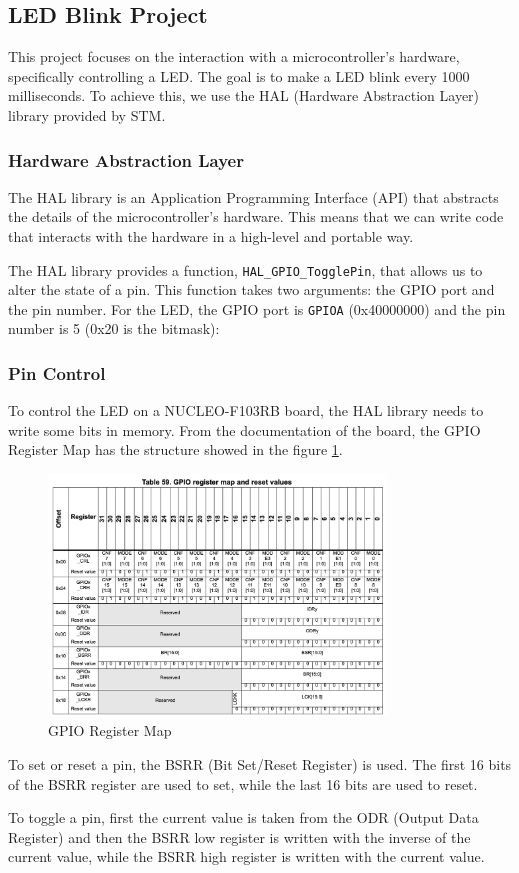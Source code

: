 \subsection{LED Blink Project}

This project focuses on the interaction with a microcontroller's hardware, specifically controlling a LED. The goal is to make a LED blink every 1000 milliseconds. To achieve this, we use the HAL (Hardware Abstraction Layer) library provided by STM.

\subsubsection{Hardware Abstraction Layer}

The HAL library is an Application Programming Interface (API) that abstracts the details of the microcontroller's hardware. This means that we can write code that interacts with the hardware in a high-level and portable way.

The HAL library provides a function, \texttt{HAL\_GPIO\_TogglePin}, that allows us to alter the state of a pin. This function takes two arguments: the GPIO port and the pin number. For the LED, the GPIO port is \texttt{GPIOA} (0x40000000) and the pin number is 5 (0x20 is the bitmask):

\subsubsection{Pin Control}

To control the LED on a NUCLEO-F103RB board, the HAL library needs to write some bits in memory. From the documentation of the board, the GPIO Register Map has the structure showed in the figure \ref{fig:gpio_register_map}.

\begin{figure}[ht]
    \centering
    \includegraphics[width=0.8\textwidth]{images/projects/gpio_register_map.png}
    \caption{GPIO Register Map}
    \label{fig:gpio_register_map}
\end{figure}

To set or reset a pin, the BSRR (Bit Set/Reset Register) is used. The first 16 bits of the BSRR register are used to set, while the last 16 bits are used to reset.

To toggle a pin, first the current value is taken from the ODR (Output Data Register) and then the BSRR low register is written with the inverse of the current value, while the BSRR high register is written with the current value.